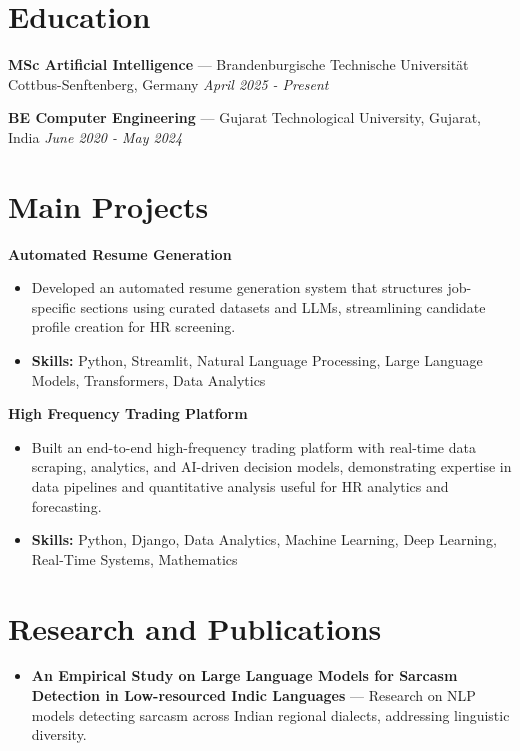 \documentclass[a4paper,10pt]{article}
\begin{document}
\section*{Education}
\textbf{MSc Artificial Intelligence} — Brandenburgische Technische Universität Cottbus-Senftenberg, Germany \hfill \textit{April 2025 - Present}\par
\vspace{1.5pt}
\textbf{BE Computer Engineering} — Gujarat Technological University, Gujarat, India \hfill \textit{June 2020 - May 2024}\par

\section*{Main Projects}
\textbf{Automated Resume Generation}\par
\vspace{1pt}
\begin{itemize}
  \item Developed an automated resume generation system that structures job-specific sections using curated datasets and LLMs, streamlining candidate profile creation for HR screening.
  \item \textbf{Skills:} Python, Streamlit, Natural Language Processing, Large Language Models, Transformers, Data Analytics
\end{itemize}
\vspace{3pt}
\textbf{High Frequency Trading Platform}\par
\vspace{1pt}
\begin{itemize}
  \item Built an end-to-end high-frequency trading platform with real-time data scraping, analytics, and AI-driven decision models, demonstrating expertise in data pipelines and quantitative analysis useful for HR analytics and forecasting.
  \item \textbf{Skills:} Python, Django, Data Analytics, Machine Learning, Deep Learning, Real-Time Systems, Mathematics
\end{itemize}

\section*{Research and Publications}
\begin{itemize}
\item \textbf{An Empirical Study on Large Language Models for Sarcasm Detection in Low-resourced Indic Languages} — Research on NLP models detecting sarcasm across Indian regional dialects, addressing linguistic diversity.
\end{itemize}
\end{document}
